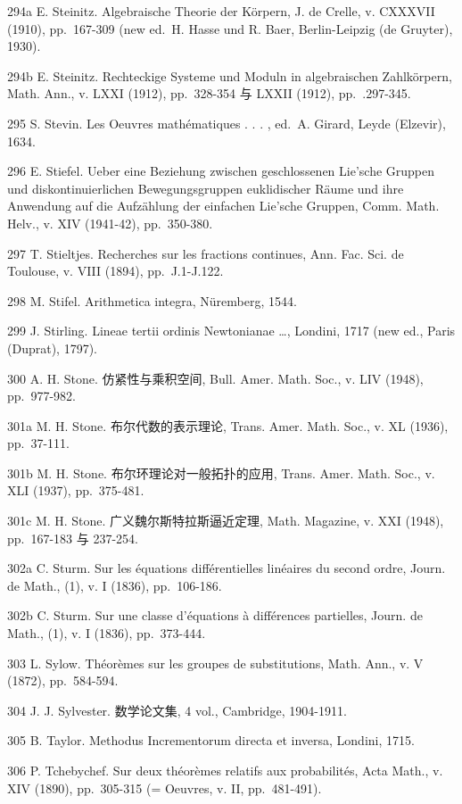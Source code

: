 294a E. Steinitz. Algebraische Theorie der Körpern, J. de Crelle, v. CXXXVII (1910), pp.~167-309 (new ed.~H. Hasse und R. Baer, Berlin-Leipzig (de Gruyter), 1930).

294b E. Steinitz. Rechteckige Systeme und Moduln in algebraischen Zahlkörpern, Math. Ann., v. LXXI (1912), pp.~328-354 与 LXXII (1912), pp.~.297-345.

295 S. Stevin. Les Oeuvres mathématiques . . . , ed.~A. Girard, Leyde (Elzevir), 1634.

296 E. Stiefel. Ueber eine Beziehung zwischen geschlossenen Lie'sche Gruppen und diskontinuierlichen Bewegungsgruppen euklidischer Räume und ihre Anwendung auf die Aufzählung der einfachen Lie'sche Gruppen, Comm. Math. Helv., v. XIV (1941-42), pp.~350-380.

297 T. Stieltjes. Recherches sur les fractions continues, Ann. Fac. Sci. de Toulouse, v. VIII (1894), pp.~J.1-J.122.

298 M. Stifel. Arithmetica integra, Nüremberg, 1544.

299 J. Stirling. Lineae tertii ordinis Newtonianae \ldots, Londini, 1717 (new ed., Paris (Duprat), 1797).

300 A. H. Stone. 仿紧性与乘积空间, Bull. Amer. Math. Soc., v. LIV (1948), pp.~977-982.

301a M. H. Stone. 布尔代数的表示理论, Trans. Amer. Math. Soc., v. XL (1936), pp.~37-111.

301b M. H. Stone. 布尔环理论对一般拓扑的应用, Trans. Amer. Math. Soc., v. XLI (1937), pp.~375-481.

301c M. H. Stone. 广义魏尔斯特拉斯逼近定理, Math. Magazine, v. XXI (1948), pp.~167-183 与 237-254.

302a C. Sturm. Sur les équations différentielles linéaires du second ordre, Journ. de Math., (1), v. I (1836), pp.~106-186.

302b C. Sturm. Sur une classe d'équations à différences partielles, Journ. de Math., (1), v. I (1836), pp.~373-444.

303 L. Sylow. Théorèmes sur les groupes de substitutions, Math. Ann., v. V (1872), pp.~584-594.

304 J. J. Sylvester. 数学论文集, 4 vol., Cambridge, 1904-1911.

305 B. Taylor. Methodus Incrementorum directa et inversa, Londini, 1715.

306 P. Tchebychef. Sur deux théorèmes relatifs aux probabilités, Acta Math., v. XIV (1890), pp.~305-315 (= Oeuvres, v. II, pp.~481-491).

